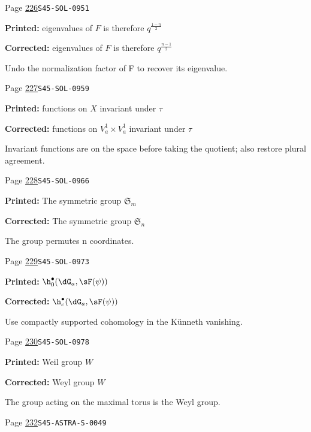 \begin{description}
\smallskip
\item[\hypertarget{apparatus:EN-0162}{162}] Page \hyperlink{printpage:en:226}{226}\quad\texttt{S45-SOL-0951}
\par\noindent\textbf{Printed:} eigenvalues of $F$ is therefore $q^{\frac{1-n}{2}}$
\par\noindent\textbf{Corrected:} eigenvalues of $F$ is therefore $q^{\frac{n-1}{2}}$
\par\noindent Undo the normalization factor of F to recover its eigenvalue.
\smallskip
\item[\hypertarget{apparatus:EN-0163}{163}] Page \hyperlink{printpage:en:227}{227}\quad\texttt{S45-SOL-0959}
\par\noindent\textbf{Printed:} functions on $X$ invariant under $\tau$
\par\noindent\textbf{Corrected:} functions on $V_a^1\times V_a^1$ invariant under $\tau$
\par\noindent Invariant functions are on the space before taking the quotient; also restore plural agreement.
\smallskip
\item[\hypertarget{apparatus:EN-0164}{164}] Page \hyperlink{printpage:en:228}{228}\quad\texttt{S45-SOL-0966}
\par\noindent\textbf{Printed:} The symmetric group $\mathfrak{S}_m$
\par\noindent\textbf{Corrected:} The symmetric group $\mathfrak{S}_n$
\par\noindent The group permutes n coordinates.
\smallskip
\item[\hypertarget{apparatus:EN-0165}{165}] Page \hyperlink{printpage:en:229}{229}\quad\texttt{S45-SOL-0973}
\par\noindent\textbf{Printed:} \(\h_0^\bullet(\dG_a,\sF(\psi))\)
\par\noindent\textbf{Corrected:} \(\h_c^\bullet(\dG_a,\sF(\psi))\)
\par\noindent Use compactly supported cohomology in the Künneth vanishing.
\smallskip
\item[\hypertarget{apparatus:EN-0166}{166}] Page \hyperlink{printpage:en:230}{230}\quad\texttt{S45-SOL-0978}
\par\noindent\textbf{Printed:} Weil group $W$
\par\noindent\textbf{Corrected:} Weyl group $W$
\par\noindent The group acting on the maximal torus is the Weyl group.
\smallskip
\item[\hypertarget{apparatus:EN-0167}{167}] Page \hyperlink{printpage:en:232}{232}\quad\texttt{S45-ASTRA-S-0049}

\end{description}

